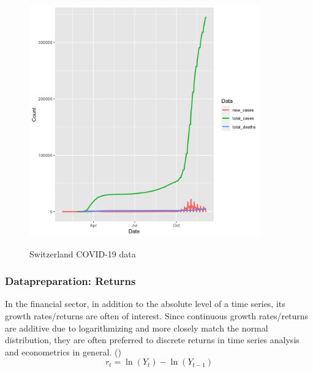 \documentclass[11pt]{article}
\begin{document}
\begin{figure}[!h]
\centering
\includegraphics[width=100mm]{R-Code/plots/switzerlandCovid.png} \\
\caption{Switzerland COVID-19 data}
\label{switzerland-covid-numbers}
\end{figure}


\subsubsection{Datapreparation: Returns}
In the financial sector, in addition to the absolute level of a time series, its growth rates/returns are often of interest.
Since continuous growth rates/returns are additive due to logarithmizing and more closely match the normal distribution, they are often preferred to discrete returns in time series analysis and econometrics in general. (\cite{PowerPoi49:online})
$$r_{t} =\ln \left(Y_{t}\right)-\ln \left(Y_{t-1}\right)$$
\end{document}
